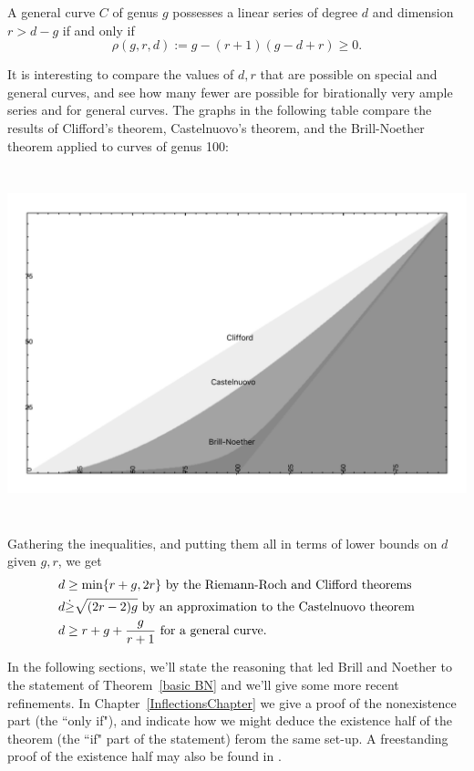 \begin{theorem}\label{basic BN}
A general curve $C$ of genus $g$  possesses a linear series of degree $d$ and dimension $r>d-g$ if and only if
$$
 \rho(g,r,d) := g - (r+1)(g-d+r) \geq 0.
$$
\end{theorem}

It is interesting to compare the values of $d,r$ that are possible on special and general curves, and see how many fewer are possible for birationally very ample series and for general curves. The graphs in the following table compare the results of 
Clifford's theorem, Castelnuovo's theorem, and the Brill-Noether theorem applied to curves
of genus 100:

\centerline{ \includegraphics[height=4in]{"Clifford-Castelnuovo-Brill-Noether"}}

Gathering the inequalities, and putting them all in terms of lower bounds on $d$ given $g, r$,
we get \goodbreak
\begin{align*}
 d &\geq \min\{r+g, 2r\} \hbox{ by the Riemann-Roch and Clifford theorems}\\
 d &\dot\geq \sqrt{(2r-2)g} \hbox{ by an approximation to the Castelnuovo theorem}\\
 d &\geq r+g+\frac{g}{r+1} \hbox{ for a general curve.}
\end{align*}

In the following sections, we'll state the reasoning that led Brill and Noether to the statement of Theorem~\ref{basic BN} and we'll give some more recent refinements.   In Chapter~\ref{InflectionsChapter} we give a proof of the nonexistence part (the ``only if"), and indicate how we might deduce  the existence half of the theorem (the ``if" part of the statement) ferom the same set-up. A freestanding proof of the existence half may also be found in \cite[Theorem ****]{3264}.

